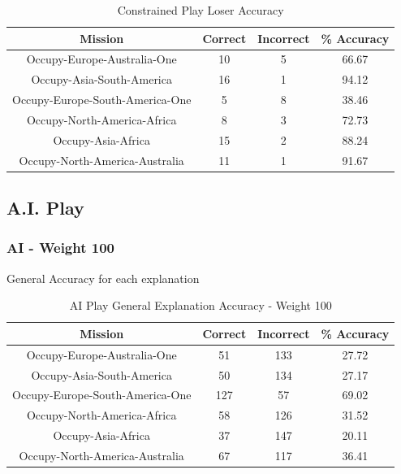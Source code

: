 \documentclass[parskip]{cs4rep}
\begin{document}
\begin{table}[ht]
\centering	
\begin{tabular}{|c|c|c|c|}
\hline 
\textbf{Mission} & \textbf{Correct} & \textbf{Incorrect} & \textbf{\% Accuracy} \\ 
\hline 
Occupy-Europe-Australia-One & 10 & 5 & 66.67 \\  
\hline 
Occupy-Asia-South-America & 16 & 1 & 94.12 \\ 
\hline
Occupy-Europe-South-America-One & 5 & 8 & 38.46 \\
\hline
Occupy-North-America-Africa & 8 & 3 & 72.73 \\
\hline
Occupy-Asia-Africa & 15 & 2 & 88.24 \\
\hline
Occupy-North-America-Australia & 11 & 1 & 91.67 \\
\hline
\end{tabular}
\caption{Constrained Play Loser Accuracy}
\label{table:constrained-lose-accuracy}
\end{table}			

\newpage

\subsection{A.I. Play}

\subsubsection{AI - Weight 100}

General Accuracy for each explanation

\begin{table}[ht]
\centering
\begin{tabular}{|c|c|c|c|}
\hline 
\textbf{Mission} & \textbf{Correct} & \textbf{Incorrect} & \textbf{\% Accuracy} \\ 
\hline 
Occupy-Europe-Australia-One & 51 & 133 & 27.72 \\  
\hline 
Occupy-Asia-South-America & 50 & 134 & 27.17 \\ 
\hline
Occupy-Europe-South-America-One & 127 & 57 & 69.02 \\
\hline
Occupy-North-America-Africa & 58 & 126 & 31.52 \\
\hline
Occupy-Asia-Africa & 37 & 147 & 20.11 \\
\hline
Occupy-North-America-Australia & 67 & 117 & 36.41 \\
\hline
\end{tabular}
\caption{AI Play General Explanation Accuracy - Weight 100}
\label{table:ai-100-general-accuracy}
\end{table}
\end{document}

